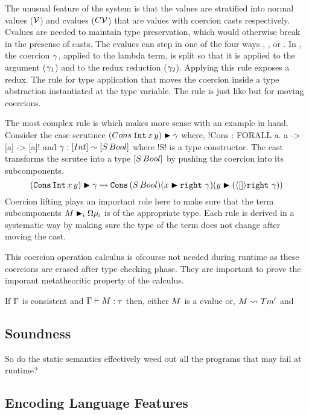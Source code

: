 \documentclass[manuscript,screen,nonacm]{acmart}
\begin{document}
The unusual feature of the system is that the values are stratified into normal values ($\mathcal{V}$) and cvalues ($C\mathcal{V}$) that are values with coercion casts respectively. Cvalues are needed to maintain type preservation, which would otherwise break in the presense of casts. The cvalues can step in one of the four ways , ,  or . In , the coercion $\gamma$, applied to the lambda term, is split so that it is applied to the argument ($\gamma_1$) and to the redux reduction ($\gamma_2$). Applying this rule exposes a \trule{$\beta$} redux. The rule  for type application that moves the coercion inside a type abstraction instantiated at the type variable.
The rule  is just like  but for moving coercions.

The most complex rule is  which makes more sense with an example in hand. Consider the case scrutinee $(Cons\, \texttt{Int}\, x\, y)\mathrel{\blacktriangleright}\gamma$ where, !Cons : FORALL a. a -> [a] -> [a]! and $\gamma : [Int] \sim [S\, Bool]$ where !S! is a type constructor. The cast transforms the scrutee into a type $[S\, Bool]$ by pushing the coercion into its subcomponents.
$$
(\texttt{Cons}\, \texttt{Int}\, x\, y)\mathrel{\blacktriangleright}\gamma \rightsquigarrow \texttt{Cons} \, (S\, Bool) (x\mathrel{\blacktriangleright}\texttt{right}~\gamma) (y\mathrel{\blacktriangleright}(\langle[]\rangle\texttt{right}~\gamma))
$$
Coercion lifting plays an important role here to make sure that the term subcomponents $M\mathrel{\blacktriangleright}_i {\Omega}\rho_i$ is of the appropriate type. Each rule is derived in a systematic way by making sure the type of the term does not change after moving the cast.

This coercion operation calculus is ofcourse not needed during runtime as these coercions are erased after type checking phase. They are important to prove the imporant metatheoritic property of the calculus.

\begin{theorem}[Progress]
  If $\Gamma$ is consistent and $\Gamma \vdash M : \tau$ then, either $M$ is a cvalue or, $M \rightsquigarrow Tm'$ and 
\end{theorem}

\subsection{Soundness}
So do the static semantics effectively weed out all the programs that may fail at runtime?
  



\subsection{Encoding Language Features}
\end{document}
